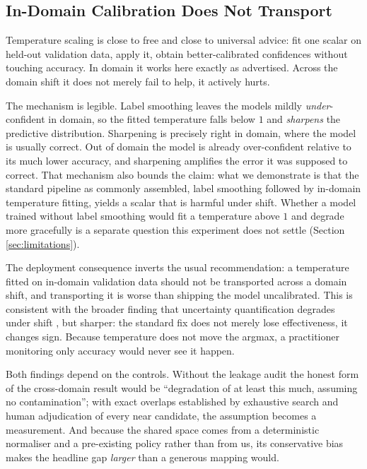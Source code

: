 \documentclass[runningheads]{llncs}
\begin{document}
\subsection{In-Domain Calibration Does Not Transport}

Temperature scaling \cite{guo2017calibration} is close to free and close to
universal advice: fit one scalar on held-out validation data, apply it, obtain
better-calibrated confidences without touching accuracy. In domain it works here
exactly as advertised. Across the domain shift it does not merely fail to help,
it actively hurts.

The mechanism is legible. Label smoothing leaves the models mildly
\emph{under}-confident in domain, so the fitted temperature falls below $1$ and
\emph{sharpens} the predictive distribution. Sharpening is precisely right in
domain, where the model is usually correct. Out of domain the model is already
over-confident relative to its much lower accuracy, and sharpening amplifies the
error it was supposed to correct. That mechanism also bounds the claim: what we
demonstrate is that the standard pipeline as commonly assembled, label smoothing
followed by in-domain temperature fitting, yields a scalar that is harmful under
shift. Whether a model trained without label smoothing would fit a temperature
above $1$ and degrade more gracefully is a separate question this experiment
does not settle (Section \ref{sec:limitations}).

The deployment consequence inverts the usual recommendation: a temperature
fitted on in-domain validation data should not be transported across a domain
shift, and transporting it is worse than shipping the model uncalibrated. This
is consistent with the broader finding that uncertainty quantification degrades
under shift \cite{ovadia2019trust}, but sharper: the standard fix does not
merely lose effectiveness, it changes sign. Because temperature does not move
the argmax, a practitioner monitoring only accuracy would never see it happen.

Both findings depend on the controls. Without the leakage audit the honest form
of the cross-domain result would be ``degradation of at least this much, assuming
no contamination''; with \NLeakExactCore{} exact overlaps established by
exhaustive search and human adjudication of every near candidate, the assumption
becomes a measurement. And because the shared space comes from a deterministic
normaliser and a pre-existing policy rather than from us, its conservative bias
makes the headline gap \emph{larger} than a generous mapping would.
\end{document}
